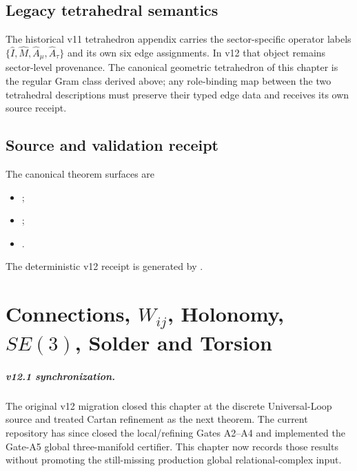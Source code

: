 \section{Legacy tetrahedral semantics}

The historical v11 tetrahedron appendix carries the sector-specific
operator labels
\(\{\hat I,\hat M,\hat A_\mu,\hat A_\tau\}\) and its own six edge assignments.
In v12 that object remains sector-level provenance.  The canonical geometric
tetrahedron of this chapter is the regular Gram class derived above; any
role-binding map between the two tetrahedral descriptions must preserve their
typed edge data and receives its own source receipt.

\section{Source and validation receipt}

The canonical theorem surfaces are
\begin{itemize}
\item {};
\item {};
\item {}.
\end{itemize}
The deterministic v12 receipt is generated by
.

\clearpage

\chapter[Connections, Holonomy, SE(3), Solder and Torsion]{Connections, $W_{ij}$, Holonomy, $SE(3)$, Solder and Torsion}
\label{ch:v12_connections_holonomy}

\paragraph{v12.1 synchronization.}
The original v12 migration closed this chapter at the discrete Universal-Loop
source and treated Cartan refinement as the next theorem.  The current
repository has since closed the local/refining Gates A2--A4 and implemented the
Gate-A5 global three-manifold certifier.  This chapter now records those results
without promoting the still-missing production global relational-complex input.


